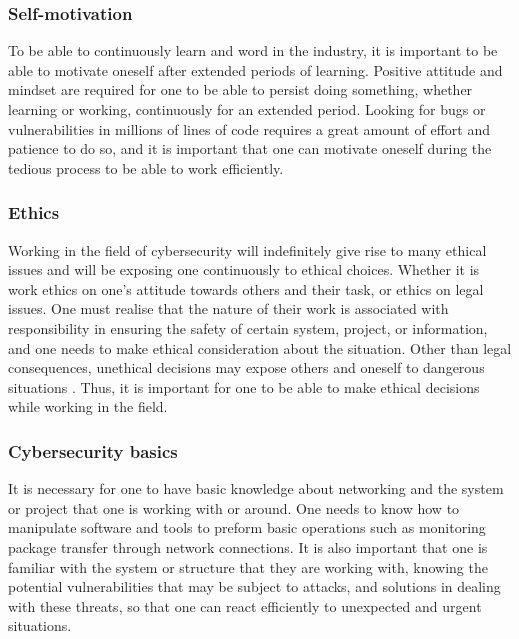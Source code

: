 \documentclass[a4paper, 11pt]{report}
\begin{document}
\subsubsection{Self-motivation}
To be able to continuously learn and word in the industry, it is important to be able to motivate oneself after extended periods of learning. Positive attitude and mindset are required for one to be able to persist doing something, whether learning or working, continuously for an extended period. Looking for bugs or vulnerabilities in millions of lines of code requires a great amount of effort and patience to do so, and it is important that one can motivate oneself during the tedious process to be able to work efficiently.  
\subsubsection{Ethics}
Working in the field of cybersecurity will indefinitely give rise to many ethical issues and will be exposing one continuously to ethical choices. Whether it is work ethics on one’s attitude towards others and their task, or ethics on legal issues. One must realise that the nature of their work is associated with responsibility in ensuring the safety of certain system, project, or information, and one needs to make ethical consideration about the situation. Other than legal consequences, unethical decisions may expose others and oneself to dangerous situations \cite{weber2016cybersecurity}. Thus, it is important for one to be able to make ethical decisions while working in the field.  
\subsubsection{Cybersecurity basics}
It is necessary for one to have basic knowledge about networking and the system or project that one is working with or around. One needs to know how to manipulate software and tools to preform basic operations such as monitoring package transfer through network connections. It is also important that one is familiar with the system or structure that they are working with, knowing the potential vulnerabilities that may be subject to attacks, and solutions in dealing with these threats, so that one can react efficiently to unexpected and urgent situations.  
\end{document}
